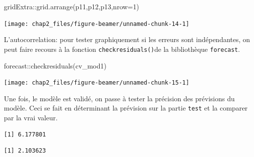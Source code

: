 \documentclass[
  8pt,
  ignorenonframetext,
]{beamer}
\newenvironment{Shaded}{\begin{snugshade}}{\end{snugshade}}
\newcommand{\AttributeTok}[1]{\textcolor[rgb]{0.77,0.63,0.00}{#1}}
\newcommand{\DecValTok}[1]{\textcolor[rgb]{0.00,0.00,0.81}{#1}}
\newcommand{\FunctionTok}[1]{\textcolor[rgb]{0.00,0.00,0.00}{#1}}
\newcommand{\NormalTok}[1]{#1}
\newcommand{\OtherTok}[1]{\textcolor[rgb]{0.56,0.35,0.01}{#1}}
\newcommand{\SpecialCharTok}[1]{\textcolor[rgb]{0.00,0.00,0.00}{#1}}
\begin{document}
\begin{frame}[fragile]
\begin{Shaded}
\begin{Highlighting}[]
\NormalTok{gridExtra}\SpecialCharTok{::}\FunctionTok{grid.arrange}\NormalTok{(p11,p12,p13,}\AttributeTok{nrow=}\DecValTok{1}\NormalTok{)}
\end{Highlighting}
\end{Shaded}

\begin{center}\texttt{[image: chap2\_files/figure-beamer/unnamed-chunk-14-1]} \end{center}

\normalsize
\end{frame}

\begin{frame}[fragile]
L'autocorrelation: pour tester graphiquement si les erreurs sont
indépendantes, on peut faire recours à la fonction
\texttt{checkresiduals()}de la bibliothèque \texttt{forecast}.
\vspace*{0.25cm}

\begin{Shaded}
\begin{Highlighting}[]
\NormalTok{forecast}\SpecialCharTok{::}\FunctionTok{checkresiduals}\NormalTok{(cv\_mod1)}
\end{Highlighting}
\end{Shaded}

\begin{center}\texttt{[image: chap2\_files/figure-beamer/unnamed-chunk-15-1]} \end{center}
\end{frame}

\begin{frame}[fragile]
Une fois, le modèle est validé, on passe à tester la précision des
prévisions du modèle. Ceci se fait en déterminant la prévision sur la
partie \texttt{test} et la comparer par la vrai valeur.

\begin{Shaded}
\end{Shaded}

\begin{verbatim}
[1] 6.177801
\end{verbatim}

\begin{Shaded}
\end{Shaded}

\begin{verbatim}
[1] 2.103623
\end{verbatim}
\end{frame}
\end{document}
